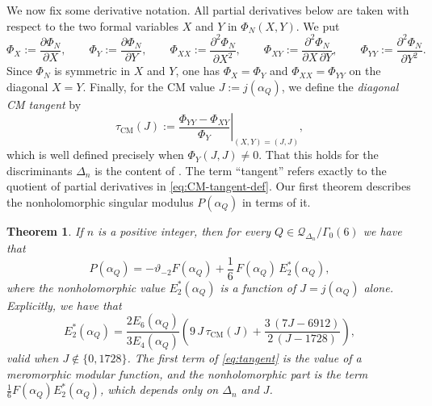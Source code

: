 \documentclass[12pt]{amsart}
\newtheorem{theorem}{Theorem}[section]
\theoremstyle{definition}
\theoremstyle{remark}
\newcommand{\cQ}{\mathcal{Q}}
\begin{document}
We now fix some derivative notation. All partial
derivatives below are taken with respect to the two formal variables $X$ and $Y$ in
$\Phi_N(X,Y)$. We put
\begin{equation}\label{eq:partial-derivative-defs}
\Phi_X:=\frac{\partial \Phi_N}{\partial X},\qquad
\Phi_Y:=\frac{\partial \Phi_N}{\partial Y},\qquad
\Phi_{XX}:=\frac{\partial^2 \Phi_N}{\partial X^2},\qquad
\Phi_{XY}:=\frac{\partial^2 \Phi_N}{\partial X\,\partial Y},\qquad
\Phi_{YY}:=\frac{\partial^2 \Phi_N}{\partial Y^2}.
\end{equation}
Since $\Phi_N$ is symmetric in $X$ and $Y$, one has $\Phi_X=\Phi_Y$ and $\Phi_{XX}=\Phi_{YY}$
on the diagonal $X=Y$. Finally, for the CM value $J:=j(\alpha_Q)$, we define the
{\it diagonal CM tangent} by
\begin{equation}\label{eq:CM-tangent-def}
\tau_{\mathrm{CM}}(J):=\left.\frac{\Phi_{YY}-\Phi_{XY}}{\Phi_Y}\right|_{(X,Y)=(J,J)},
\end{equation}
which is well defined precisely when $\Phi_Y(J,J)\ne0$. That this holds for the discriminants
$\Delta_n$ is the content of . The term ``tangent'' refers exactly to the
quotient of partial derivatives in \eqref{eq:CM-tangent-def}.  Our
first theorem describes the nonholomorphic singular modulus $P(\alpha_Q)$ in terms of it.


\begin{theorem}\label{thm:tangent} If $n$ is a positive integer, then
for every $Q\in\cQ_{\Delta_n}/\Gamma_0(6)$ we have that
\begin{equation}\label{eq:tangent}
P(\alpha_Q)=-\vartheta_{-2}F(\alpha_Q)
+\frac16\,F(\alpha_Q)\,E_2^*(\alpha_Q),
\end{equation}
where the nonholomorphic value $E_2^*(\alpha_Q)$ is a function of $J=j(\alpha_Q)$ alone. Explicitly, we have that
\begin{equation}\label{eq:tangent-explicit}
E_2^*(\alpha_Q)=\frac{2E_6(\alpha_Q)}{3E_4(\alpha_Q)}
\left(9\,J\,\tau_{\mathrm{CM}}(J)+\frac{3\,(7J-6912)}{2\,(J-1728)}\right),
\end{equation}
valid when $J\notin\{0,1728\}$. The first term of \eqref{eq:tangent} is the value of a
meromorphic modular function, and the nonholomorphic part  is
the term $\tfrac16 F(\alpha_Q)E_2^*(\alpha_Q)$, which depends only on $\Delta_n$ and $J$.
\end{theorem}
\end{document}
